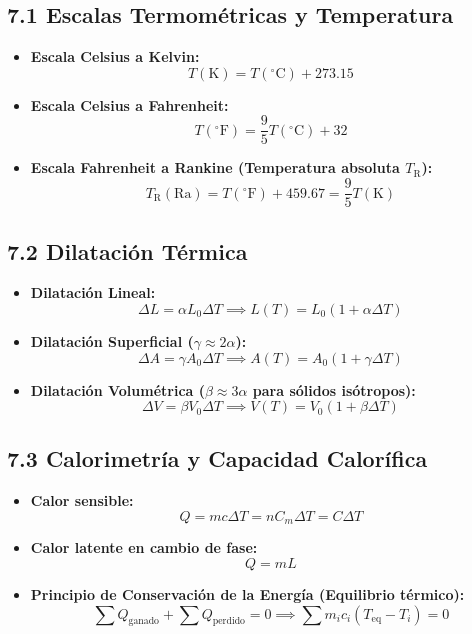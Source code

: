 \documentclass[11pt,a4paper]{article}
\begin{document}
\subsection*{7.1 Escalas Termométricas y Temperatura}

\begin{itemize}
  \item \textbf{Escala Celsius a Kelvin:}
  \[
    T(\mathrm{K}) = T(^\circ\mathrm{C}) + 273.15
  \]
  \item \textbf{Escala Celsius a Fahrenheit:}
  \[
    T(^\circ\mathrm{F}) = \frac{9}{5} T(^\circ\mathrm{C}) + 32
  \]
  \item \textbf{Escala Fahrenheit a Rankine (Temperatura absoluta $T_{\mathrm{R}}$):}
  \[
    T_{\mathrm{R}}(\mathrm{Ra}) = T(^\circ\mathrm{F}) + 459.67 = \frac{9}{5} T(\mathrm{K})
  \]
\end{itemize}

\subsection*{7.2 Dilatación Térmica}

\begin{itemize}
  \item \textbf{Dilatación Lineal:}
  \[
    \Delta L = \alpha L_0 \Delta T \implies L(T) = L_0 (1 + \alpha \Delta T)
  \]
  \item \textbf{Dilatación Superficial ($\gamma \approx 2\alpha$):}
  \[
    \Delta A = \gamma A_0 \Delta T \implies A(T) = A_0 (1 + \gamma \Delta T)
  \]
  \item \textbf{Dilatación Volumétrica ($\beta \approx 3\alpha$ para sólidos isótropos):}
  \[
    \Delta V = \beta V_0 \Delta T \implies V(T) = V_0 (1 + \beta \Delta T)
  \]
\end{itemize}

\subsection*{7.3 Calorimetría y Capacidad Calorífica}

\begin{itemize}
  \item \textbf{Calor sensible:}
  \[
    Q = m c \Delta T = n C_m \Delta T = C \Delta T
  \]
  \item \textbf{Calor latente en cambio de fase:}
  \[
    Q = m L
  \]
  \item \textbf{Principio de Conservación de la Energía (Equilibrio térmico):}
  \[
    \sum Q_{\text{ganado}} + \sum Q_{\text{perdido}} = 0 \implies \sum m_i c_i (T_{\mathrm{eq}} - T_i) = 0
  \]
\end{itemize}
\end{document}
